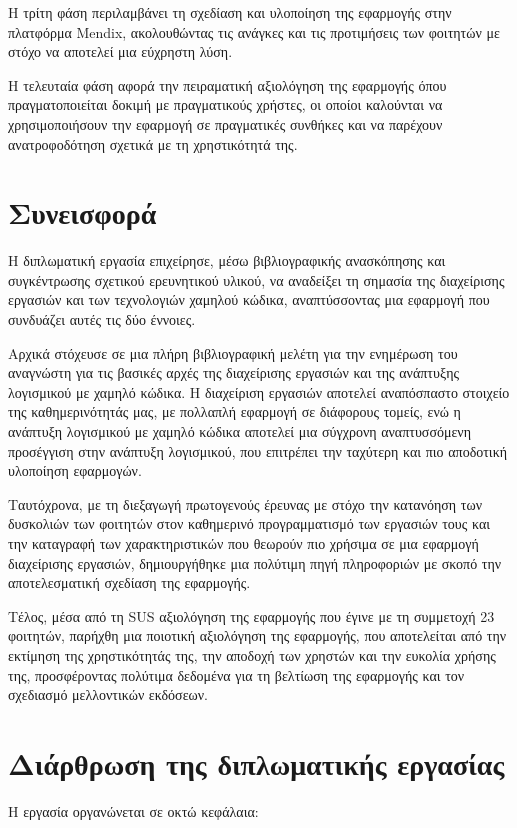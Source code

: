		Η τρίτη φάση περιλαμβάνει τη σχεδίαση και υλοποίηση της εφαρμογής στην πλατφόρμα Mendix, ακολουθώντας τις ανάγκες και τις προτιμήσεις των φοιτητών με στόχο να αποτελεί μια εύχρηστη λύση.

		Η τελευταία φάση αφορά την πειραματική αξιολόγηση της εφαρμογής όπου πραγματοποιείται δοκιμή με πραγματικούς χρήστες, οι οποίοι καλούνται να χρησιμοποιήσουν την εφαρμογή σε πραγματικές συνθήκες και να παρέχουν ανατροφοδότηση σχετικά με τη χρηστικότητά της.


	\section{Συνεισφορά}
		Η διπλωματική εργασία επιχείρησε, μέσω βιβλιογραφικής ανασκόπησης και συγκέντρωσης σχετικού ερευνητικού υλικού, να αναδείξει τη σημασία της διαχείρισης εργασιών και των τεχνολογιών χαμηλού κώδικα, αναπτύσσοντας μια εφαρμογή που συνδυάζει αυτές τις δύο έννοιες.

		Αρχικά στόχευσε σε μια πλήρη βιβλιογραφική μελέτη για την ενημέρωση του αναγνώστη για τις βασικές αρχές της διαχείρισης εργασιών και της ανάπτυξης λογισμικού με χαμηλό κώδικα. Η διαχείριση εργασιών αποτελεί αναπόσπαστο στοιχείο της καθημερινότητάς μας, με πολλαπλή εφαρμογή σε διάφορους τομείς, ενώ η ανάπτυξη λογισμικού με χαμηλό κώδικα αποτελεί μια σύγχρονη αναπτυσσόμενη προσέγγιση στην ανάπτυξη λογισμικού, που επιτρέπει την ταχύτερη και πιο αποδοτική υλοποίηση εφαρμογών.

		Ταυτόχρονα, με τη διεξαγωγή πρωτογενούς έρευνας με στόχο την κατανόηση των δυσκολιών των φοιτητών στον καθημερινό προγραμματισμό των εργασιών τους και την καταγραφή των χαρακτηριστικών που θεωρούν πιο χρήσιμα σε μια εφαρμογή διαχείρισης εργασιών, δημιουργήθηκε μια πολύτιμη πηγή πληροφοριών με σκοπό την αποτελεσματική σχεδίαση της εφαρμογής.

		Τέλος, μέσα από τη SUS αξιολόγηση της εφαρμογής που έγινε με τη συμμετοχή 23 φοιτητών, παρήχθη μια ποιοτική αξιολόγηση της εφαρμογής, που αποτελείται από την εκτίμηση της χρηστικότητάς της, την αποδοχή των χρηστών και την ευκολία χρήσης της, προσφέροντας πολύτιμα δεδομένα για τη βελτίωση της εφαρμογής και τον σχεδιασμό μελλοντικών εκδόσεων.


	\section{Διάρθρωση της διπλωματικής εργασίας}
		Η εργασία οργανώνεται σε οκτώ κεφάλαια:

